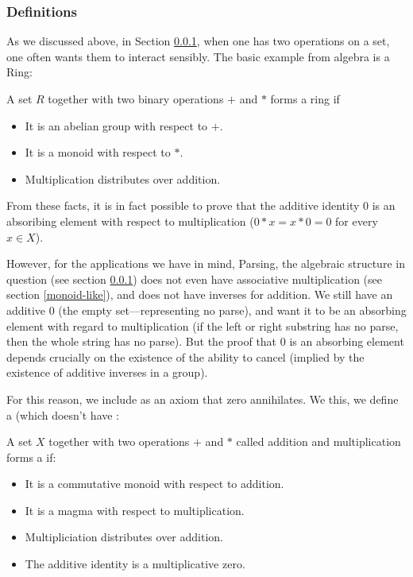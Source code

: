 \subsubsection{Definitions}
As we discussed above, in Section \ref{}, when one has two operations on a set, one often wants them to interact sensibly. The basic example from algebra is a Ring:
\begin{Definition}
A set $R$ together with two binary operations $+$ and $*$ forms a ring if
\begin{itemize}
\item It is an abelian group with respect to $+$.
\item It is a monoid with respect to $*$.
\item Multiplication distributes over addition.
\end{itemize}
\end{Definition}
From these facts, it is in fact possible to prove that the additive identity $0$ is an absoribing element with respect to multiplication ($0 * x = x * 0 = 0$ for every $x \in X$).

However, for the applications we have in mind, Parsing, the algebraic structure in question (see section \ref{}) does not even have associative multiplication (see section \ref{monoid-like}), and does not have inverses for addition. We still have an additive $0$ (the empty set---representing no parse), and want it to be an absorbing element with regard to multiplication (if the left or right substring has no parse, then the whole string has no parse). But the proof that $0$ is an absorbing element depends crucially on the existence of the ability to cancel (implied by the existence of additive inverses in a group).

For this reason, we include as an axiom that zero annihilates. We this, we define a \nanring (which doesn't have :
\begin{Definition}
A set $X$ together with two operations $+$ and $*$ called addition and multiplication forms a \emph{\nanring} if:
\begin{itemize}
\item It is a commutative monoid with respect to addition.
\item It is a magma with respect to multiplication.
\item Multipliciation distributes over addition.
\item The additive identity is a multiplicative zero.
\end{itemize}
\end{Definition}
